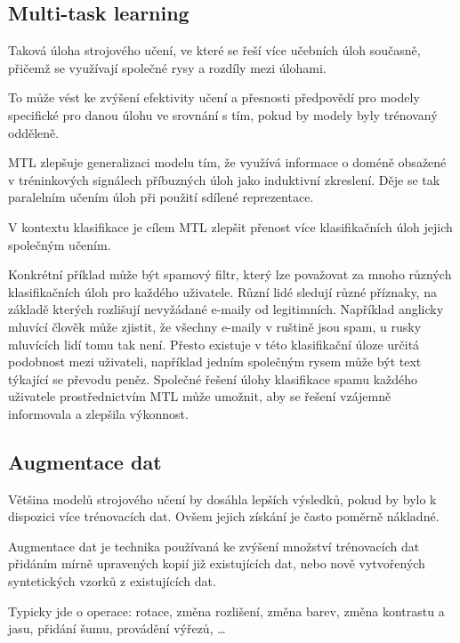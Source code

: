 \subsection{Multi-task learning}

\begin{compactitem}
    \item Taková úloha strojového učení, ve které se řeší více učebních úloh současně, přičemž se využívají společné rysy a rozdíly mezi úlohami.

    \item To může vést ke zvýšení efektivity učení a přesnosti předpovědí pro modely specifické pro danou úlohu ve srovnání s tím, pokud by modely byly trénovaný odděleně.

    \item MTL zlepšuje generalizaci modelu tím, že využívá informace o doméně obsažené v tréninkových signálech příbuzných úloh jako induktivní zkreslení. Děje se tak paralelním učením úloh při použití sdílené reprezentace.

    \item V kontextu klasifikace je cílem MTL zlepšit přenost více klasifikačních úloh jejich společným učením.
    \begin{compactitem}
        \item Konkrétní příklad může být spamový filtr, který lze považovat za mnoho různých klasifikačních úloh pro každého uživatele. Různí lidé sledují různé příznaky, na základě kterých rozlišují nevyžádané e-maily od legitimních. Například anglicky mluvící člověk může zjistit, že všechny e-maily v ruštině jsou spam, u rusky mluvících lidí tomu tak není. Přesto existuje v této klasifikační úloze určitá podobnost mezi uživateli, například jedním společným rysem může být text týkající se převodu peněz. Společné řešení úlohy klasifikace spamu každého uživatele prostřednictvím MTL může umožnit, aby se řešení vzájemně informovala a zlepšila výkonnost.
    \end{compactitem}
\end{compactitem}

\subsection{Augmentace dat}

\begin{compactitem}
    \item Většina modelů strojového učení by dosáhla lepších výsledků, pokud by bylo k dispozici více trénovacích dat. Ovšem jejich získání je často poměrně nákladné.

    \item Augmentace dat je technika používaná ke zvýšení množství trénovacích dat přidáním mírně upravených kopií již existujících dat, nebo nově vytvořených syntetických vzorků z existujících dat.

    \item Typicky jde o operace: rotace, změna rozlišení, změna barev, změna kontrastu a jasu, přidání šumu, provádění výřezů, \dots
\end{compactitem}

